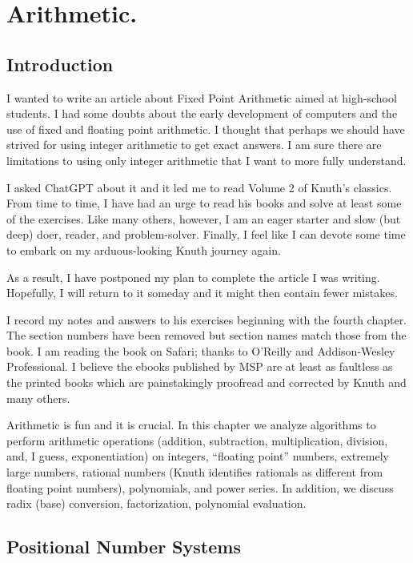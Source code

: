 \chapter{Arithmetic.}
\label{cha:arithmetic}

\section*{Introduction}
I wanted to write an article about Fixed Point Arithmetic aimed at high-school students. I had some doubts about the early development of computers and the use of fixed and floating point arithmetic. I thought that perhaps we should have strived for using integer arithmetic to get exact answers. I am sure there are limitations to using only integer arithmetic that I want to more fully understand.

I asked ChatGPT about it and it led me to read Volume 2 of Knuth's classics. From time to time, I have had an urge to read his books and solve at least some of the exercises. Like many others, however, I am an eager starter and slow (but deep) doer, reader, and problem-solver. Finally, I feel like I can devote some time to embark on my arduous-looking Knuth journey again. 

As a result, I have postponed my plan to complete the article I was writing. Hopefully, I will return to it someday and it might then contain fewer mistakes.

I record my notes and answers to his exercises beginning with the fourth chapter. The section numbers have been removed but section names match those from the book. I am reading the book on Safari; thanks to O'Reilly and Addison-Wesley Professional. I believe the ebooks published by MSP are at least as faultless as the printed books which are painstakingly proofread and corrected by Knuth and many others.

Arithmetic is fun and it is crucial. In this chapter we analyze algorithms to perform arithmetic operations (addition, subtraction, multiplication, division, and, I guess, exponentiation) on integers, ``floating point'' numbers, extremely large numbers, rational numbers (Knuth identifies rationals as different from floating point numbers), polynomials, and power series. In addition, we discuss radix (base) conversion, factorization, polynomial evaluation.

\section*{Positional Number Systems}
\label{sec:positional}

